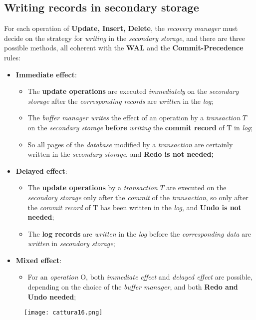 \documentclass{article}
\begin{document}
\subsection{Writing records in secondary storage}
For each operation of \textbf{Update, Insert, Delete}, the \emph{recovery manager} must decide on the strategy for \emph{writing} in the \emph{secondary storage}, and there are three possible methods, all coherent with the \textbf{WAL} and the \textbf{Commit-Precedence} rules:
\begin{itemize}
\item \textbf{Immediate effect}:
\begin{itemize}
\item The \textbf{update operations} are executed \emph{immediately} on the \emph{secondary storage} after the \emph{corresponding records} are \emph{written} in the \emph{log};
\item The \emph{buffer manager writes} the effect of an operation by a \emph{transaction} $T$ on the \emph{secondary storage} \textbf{before} \emph{writing} the \textbf{commit record} of T in \emph{log};
\item So all pages of the \emph{database} modified by a \emph{transaction} are certainly written in the \emph{secondary storage}, and \textbf{Redo is not needed;}
\end{itemize}
\item \textbf{Delayed effect}:
\begin{itemize}
\item The \textbf{update operations} by a \emph{transaction} $T$ are executed on the \emph{secondary storage} only after the \emph{commit} of the \emph{transaction}, so only after the \emph{commit record} of T has been written in the \emph{log}, and \textbf{Undo is not needed};
\item The \textbf{log records} are \emph{written} in the \emph{log} before the \emph{corresponding data} are \emph{written} in \emph{secondary storage};
\end{itemize}
\item \textbf{Mixed effect}:
\begin{itemize}
\item For an \emph{operation} O, both \emph{immediate effect} and \emph{delayed effect} are possible, depending on the choice of the \emph{buffer manager}, and both \textbf{Redo and Undo needed};
\end{itemize}
\end{itemize}
\begin{figure}[H]
  \centering
  \texttt{[image: cattura16.png]}
\end{figure}
\end{document}
